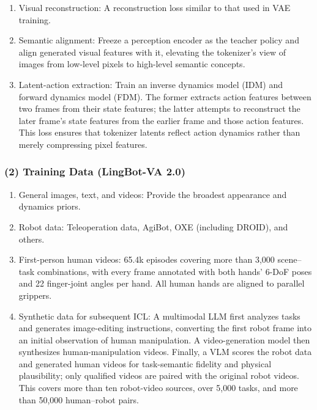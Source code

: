 \begin{enumerate}
\def\labelenumi{(\arabic{enumi})}
\item
  Visual reconstruction: A reconstruction loss similar to that used in VAE training.
\item
  Semantic alignment: Freeze a perception encoder as the teacher policy and align generated visual features with it, elevating the tokenizer's view of images from low-level pixels to high-level semantic concepts.
\item
  Latent-action extraction: Train an inverse dynamics model (IDM) and forward dynamics model (FDM). The former extracts action features between two frames from their state features; the latter attempts to reconstruct the later frame's state features from the earlier frame and those action features. This loss ensures that tokenizer latents reflect action dynamics rather than merely compressing pixel features.
\end{enumerate}

\hypertarget{training-data-lingbot-va-2.0}{%
\subsubsection{(2) Training Data (LingBot-VA 2.0)}\label{training-data-lingbot-va-2.0}}

\begin{enumerate}
\def\labelenumi{\arabic{enumi}.}
\item
  General images, text, and videos: Provide the broadest appearance and dynamics priors.
\item
  Robot data: Teleoperation data, AgiBot, OXE (including DROID), and others.
\item
  First-person human videos: 65.4k episodes covering more than 3,000 scene--task combinations, with every frame annotated with both hands' 6-DoF poses and 22 finger-joint angles per hand. All human hands are aligned to parallel grippers.
\item
  Synthetic data for subsequent ICL: A multimodal LLM first analyzes tasks and generates image-editing instructions, converting the first robot frame into an initial observation of human manipulation. A video-generation model then synthesizes human-manipulation videos. Finally, a VLM scores the robot data and generated human videos for task-semantic fidelity and physical plausibility; only qualified videos are paired with the original robot videos. This covers more than ten robot-video sources, over 5,000 tasks, and more than 50,000 human--robot pairs.
\end{enumerate}


